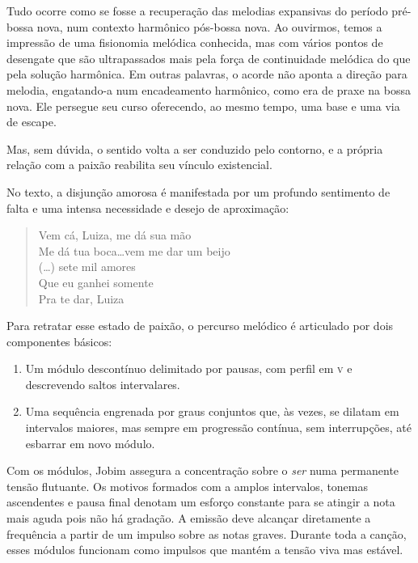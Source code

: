 Tudo ocorre como se fosse a recuperação das melodias expansivas do
período pré-bossa nova, num contexto harmônico pós-bossa nova. Ao
ouvirmos, temos a impressão de uma fisionomia melódica conhecida, mas
com vários pontos de desengate que são ultrapassados mais pela força de
continuidade melódica do que pela solução harmônica. Em outras palavras,
o acorde não aponta a direção para melodia, engatando-a num encadeamento
harmônico, como era de praxe na bossa nova. Ele persegue seu curso
oferecendo, ao mesmo tempo, uma base e uma via de escape.

Mas, sem dúvida, o sentido volta a ser conduzido pelo contorno, e a
própria relação com a paixão reabilita seu vínculo existencial.

No texto, a disjunção amorosa é manifestada por um profundo sentimento
de falta e uma intensa necessidade e desejo de aproximação:

\begin{verse}
\small{Vem cá, Luiza, me dá sua mão\\
Me dá tua boca\ldots vem me dar um beijo\\
(\ldots) sete mil amores\\
Que eu ganhei somente\\
Pra te dar, Luiza}
\end{verse}

Para retratar esse estado de paixão, o percurso melódico é articulado
por dois componentes básicos: 


\begin{enumerate}
\item Um módulo descontínuo delimitado por
pausas, com perfil em \textsc{v} e descrevendo saltos intervalares.

\item Uma sequência engrenada por graus conjuntos que, às vezes, se
dilatam em intervalos maiores, mas sempre em progressão contínua, sem
interrupções, até esbarrar em novo módulo.
\end{enumerate}


Com os módulos, Jobim assegura a concentração sobre o \textit{ser} numa
permanente tensão flutuante. Os motivos formados com a amplos
intervalos, tonemas ascendentes e pausa final denotam um esforço
constante para se atingir a nota mais aguda pois não há gradação. A
emissão deve alcançar diretamente a frequência a partir de um impulso
sobre as notas graves. Durante toda a canção, esses módulos funcionam
como impulsos que mantém a tensão viva mas estável.

